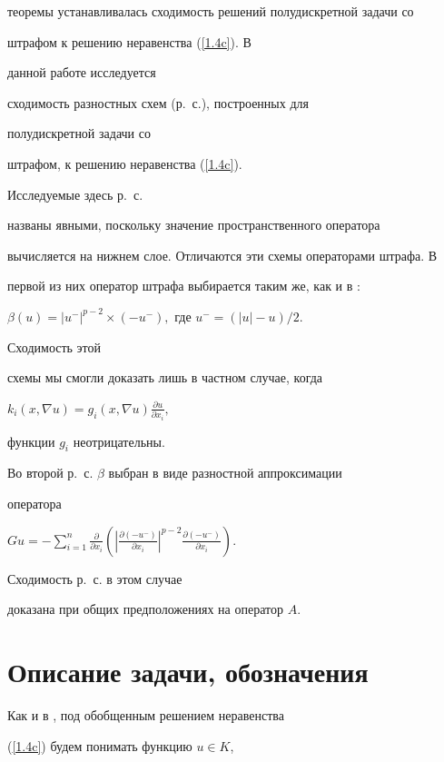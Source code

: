 теоремы устанавливалась сходимость решений полудискретной задачи со


штрафом к решению неравенства (\ref{1.4c}). В


данной  работе исследуется


сходимость разностных схем (р.~с.), построенных для


полудискретной задачи со


штрафом, к решению неравенства (\ref{1.4c}).





Исследуемые здесь р.~с.


названы явными, поскольку значение пространственного оператора


вычисляется на нижнем слое. Отличаются эти схемы операторами штрафа. В


первой из них оператор штрафа выбирается таким же, как и в \cite{N}:


$\beta(u) = |u^{-} |^{p-2} \times (- u^{-}),$ где $ u^{-}=(|u|- u )/2. $


Сходимость этой


схемы мы смогли доказать лишь в частном случае, когда


$ k_i ( x, \nabla u ) =


 g_i(x,\nabla u) \frac{\partial u}{\partial x_i},$


 функции $g_i$ неотрицательны.


 Во второй р.~с. $\beta$ выбран в виде разностной аппроксимации


 оператора


 $Gu = - \sum_{i=1}^{n} \frac{\partial}{\partial x_i}


\left (\left |\frac{\partial (-u^{-})}{\partial x_i}


 \right |^{p-2} \frac{\partial (-u^{-})}{\partial x_i}\right ).$


Сходимость р.~с. в этом случае


доказана при общих предположениях на оператор $A$.





\section{Описание задачи, обозначения}


Как и в \cite{N}, под обобщенным решением неравенства


(\ref{1.4c}) будем понимать функцию $u\in K$,



